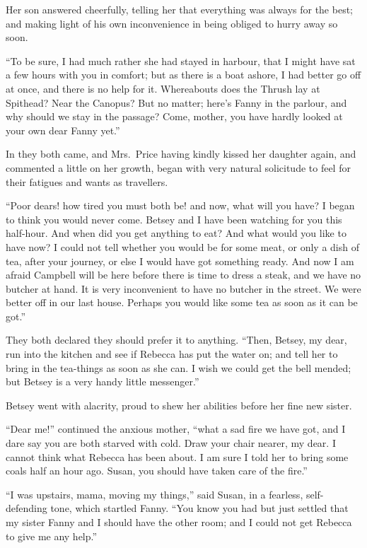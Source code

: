 \documentclass{article}
\begin{document}
Her son answered cheerfully, telling her that everything
was always for the best; and making light of his own
inconvenience in being obliged to hurry away so soon.

``To be sure, I had much rather she had stayed in harbour,
that I might have sat a few hours with you in comfort;
but as there is a boat ashore, I had better go off at once,
and there is no help for it.  Whereabouts does the Thrush
lay at Spithead?  Near the Canopus?  But no matter;
here's Fanny in the parlour, and why should we stay in
the passage?  Come, mother, you have hardly looked at your
own dear Fanny yet.''

In they both came, and Mrs.\ Price having kindly kissed
her daughter again, and commented a little on her growth,
began with very natural solicitude to feel for their
fatigues and wants as travellers.

``Poor dears! how tired you must both be! and now,
what will you have?  I began to think you would never come.
Betsey and I have been watching for you this half-hour.
And when did you get anything to eat?  And what would you
like to have now?  I could not tell whether you would be
for some meat, or only a dish of tea, after your journey,
or else I would have got something ready.  And now I
am afraid Campbell will be here before there is time
to dress a steak, and we have no butcher at hand.
It is very inconvenient to have no butcher in the street.
We were better off in our last house.  Perhaps you would
like some tea as soon as it can be got.''

They both declared they should prefer it to anything.
``Then, Betsey, my dear, run into the kitchen and see if Rebecca
has put the water on; and tell her to bring in the tea-things
as soon as she can.  I wish we could get the bell mended;
but Betsey is a very handy little messenger.''

Betsey went with alacrity, proud to shew her abilities
before her fine new sister.

``Dear me!'' continued the anxious mother, ``what a sad
fire we have got, and I dare say you are both starved
with cold.  Draw your chair nearer, my dear.  I cannot
think what Rebecca has been about.  I am sure I told her
to bring some coals half an hour ago.  Susan, you should
have taken care of the fire.''

``I was upstairs, mama, moving my things,'' said Susan,
in a fearless, self-defending tone, which startled Fanny.
``You know you had but just settled that my sister Fanny
and I should have the other room; and I could not get
Rebecca to give me any help.''
\end{document}
